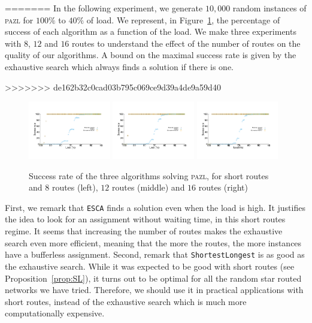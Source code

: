 \documentclass[a4paper,10pt]{article}
\newcommand\shortestlongest{\texttt{ShortestLongest}\xspace}
\newcommand\ESCA{\texttt{ESCA}\xspace}
\newcommand\pazl{\textsc{pazl}\xspace}
\begin{document}
      
=======
        In the following experiment, we generate $10,000$ random instances of \pazl for $100\%$ to $40\%$ of load. We represent, in Figure~\ref{fig:short}, the percentage of success of each algorithm as a function of the load. We make three experiments with $8$, $12$ and $16$ routes to understand the effect of the number of routes on the quality of our algorithms. A bound on the maximal success rate is given by the exhaustive search which always finds a solution if there is one. 
      
       
>>>>>>> de162b32c0cad03b795c069ce9d39a4de9a59d40

      \begin{figure}[h]
      \begin{center}
	 \includegraphics[width=0.32\textwidth]{pazlshort8.pdf}
	 \includegraphics[width=0.32\textwidth]{pazlshort12.pdf}
	 \includegraphics[width=0.32\textwidth]{pazlshort16.pdf}
      \end{center}
      \caption{Success rate of the three algorithms solving \pazl, for short routes and $8$ routes (left), $12$ routes (middle) and $16$ routes (right)}\label{fig:short}
      \end{figure}

      First, we remark that \ESCA finds a solution even when the load is high. It justifies the idea to look for an assignment without waiting time, in this short routes regime. 
      It seems that increasing the number of routes makes the exhaustive search even more efficient, meaning that the more the routes, the more instances have a bufferless assignment. 
      Second, remark that \shortestlongest is as good as the exhaustive search. While it was expected to be good with short routes (see Proposition~\ref{prop:SL}), it turns out to be optimal for all the random star routed networks we have tried. Therefore, we should use it in practical applications with short routes, instead of the exhaustive search which is much more computationally expensive. 
\end{document}
